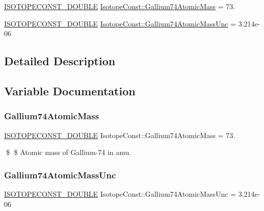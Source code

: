 \begin{DoxyCompactItemize}
\item 
\mbox{\hyperlink{group___isotope_const-_macros_ga8f45a7272ce02c0b4c65c44636ed719a}{I\+S\+O\+T\+O\+P\+E\+C\+O\+N\+S\+T\+\_\+\+D\+O\+U\+B\+LE}} \mbox{\hyperlink{group___isotope_const-_gallium-_ga74_ga0a5ba57277274042add939655e14e7a5}{Isotope\+Const\+::\+Gallium74\+Atomic\+Mass}} = 73.
\item 
\mbox{\hyperlink{group___isotope_const-_macros_ga8f45a7272ce02c0b4c65c44636ed719a}{I\+S\+O\+T\+O\+P\+E\+C\+O\+N\+S\+T\+\_\+\+D\+O\+U\+B\+LE}} \mbox{\hyperlink{group___isotope_const-_gallium-_ga74_ga958bb53bc71e4338ce759ae7f206392c}{Isotope\+Const\+::\+Gallium74\+Atomic\+Mass\+Unc}} = 3.\+214e-\/06
\end{DoxyCompactItemize}


\subsection{Detailed Description}


\subsection{Variable Documentation}
\mbox{\label{group___isotope_const-_gallium-_ga74_ga0a5ba57277274042add939655e14e7a5}} 
\subsubsection{\texorpdfstring{Gallium74\+Atomic\+Mass}{Gallium74AtomicMass}}
{\footnotesize\ttfamily \mbox{\hyperlink{group___isotope_const-_macros_ga8f45a7272ce02c0b4c65c44636ed719a}{I\+S\+O\+T\+O\+P\+E\+C\+O\+N\+S\+T\+\_\+\+D\+O\+U\+B\+LE}} Isotope\+Const\+::\+Gallium74\+Atomic\+Mass = 73.}

\$ \$ Atomic mass of Gallium-\/74 in amu. \mbox{\label{group___isotope_const-_gallium-_ga74_ga958bb53bc71e4338ce759ae7f206392c}} 
\subsubsection{\texorpdfstring{Gallium74\+Atomic\+Mass\+Unc}{Gallium74AtomicMassUnc}}
{\footnotesize\ttfamily \mbox{\hyperlink{group___isotope_const-_macros_ga8f45a7272ce02c0b4c65c44636ed719a}{I\+S\+O\+T\+O\+P\+E\+C\+O\+N\+S\+T\+\_\+\+D\+O\+U\+B\+LE}} Isotope\+Const\+::\+Gallium74\+Atomic\+Mass\+Unc = 3.\+214e-\/06}

